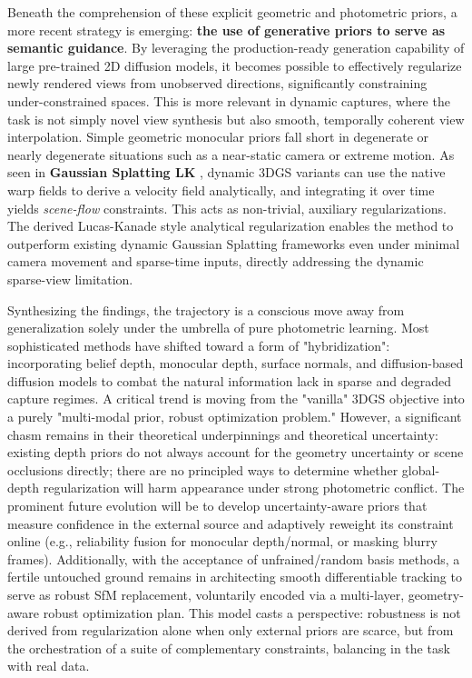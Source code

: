 \documentclass[11pt,a4paper]{article}
\begin{document}
Beneath the comprehension of these explicit geometric and photometric priors, a more recent strategy is emerging: \textbf{the use of generative priors to serve as semantic guidance}. By leveraging the production-ready generation capability of large pre-trained 2D diffusion models, it becomes possible to effectively regularize newly rendered views from unobserved directions, significantly constraining under-constrained spaces. This is more relevant in dynamic captures, where the task is not simply novel view synthesis but also smooth, temporally coherent view interpolation. Simple geometric monocular priors fall short in degenerate or nearly degenerate situations such as a near-static camera or extreme motion. As seen in \textbf{Gaussian Splatting LK} \cite{arxiv:2407.11309v1}, dynamic 3DGS variants can use the native warp fields to derive a velocity field analytically, and integrating it over time yields \emph{scene-flow} constraints. This acts as non-trivial, auxiliary regularizations. The derived Lucas-Kanade style analytical regularization enables the method to outperform existing dynamic Gaussian Splatting frameworks even under minimal camera movement and sparse-time inputs, directly addressing the dynamic sparse-view limitation.

Synthesizing the findings, the trajectory is a conscious move away from generalization solely under the umbrella of pure photometric learning. Most sophisticated methods have shifted toward a form of "hybridization": incorporating belief depth, monocular depth, surface normals, and diffusion-based diffusion models to combat the natural information lack in sparse and degraded capture regimes. A critical trend is moving from the "vanilla" 3DGS objective into a purely "multi-modal prior, robust optimization problem." However, a significant chasm remains in their theoretical underpinnings and theoretical uncertainty: existing depth priors do not always account for the geometry uncertainty or scene occlusions directly; there are no principled ways to determine whether global-depth regularization will harm appearance under strong photometric conflict. The prominent future evolution will be to develop uncertainty-aware priors that measure confidence in the external source and adaptively reweight its constraint online (e.g., reliability fusion for monocular depth/normal, or masking blurry frames). Additionally, with the acceptance of unfrained/random basis methods, a fertile untouched ground remains in architecting smooth differentiable tracking to serve as robust SfM replacement, voluntarily encoded via a multi-layer, geometry-aware robust optimization plan. This model casts a perspective: robustness is not derived from regularization alone when only external priors are scarce, but from the orchestration of a suite of complementary constraints, balancing in the task with real data.
\end{document}
